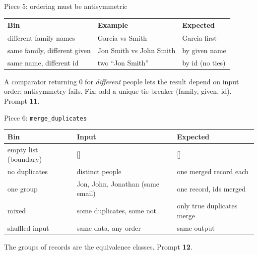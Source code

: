 \begin{frame}{Piece 5: ordering must be antisymmetric}
\begin{tabular}{@{}lll@{}}
\textbf{Bin} & \textbf{Example} & \textbf{Expected}\\\midrule
different family names & Garcia vs Smith & Garcia first\\
same family, different given & Jon Smith vs John Smith & by given name\\
same name, different id & two ``Jon Smith'' & by id (no ties)\\
\end{tabular}
\vspace{4pt}

{\small A comparator returning 0 for \emph{different} people lets the result depend on input order: antisymmetry fails. Fix: add a unique tie-breaker (family, given, id). Prompt \textbf{11}.}
\end{frame}

\begin{frame}{Piece 6: \texttt{merge\_duplicates}}
\begin{tabular}{@{}lll@{}}
\textbf{Bin} & \textbf{Input} & \textbf{Expected}\\\midrule
empty list (boundary) & [] & []\\
no duplicates & distinct people & one merged record each\\
one group & Jon, John, Jonathan (same email) & one record, ids merged\\
mixed & some duplicates, some not & only true duplicates merge\\
shuffled input & same data, any order & same output\\
\end{tabular}
\vspace{4pt}

{\small The groups of records are the equivalence classes. Prompt \textbf{12}.}
\end{frame}

